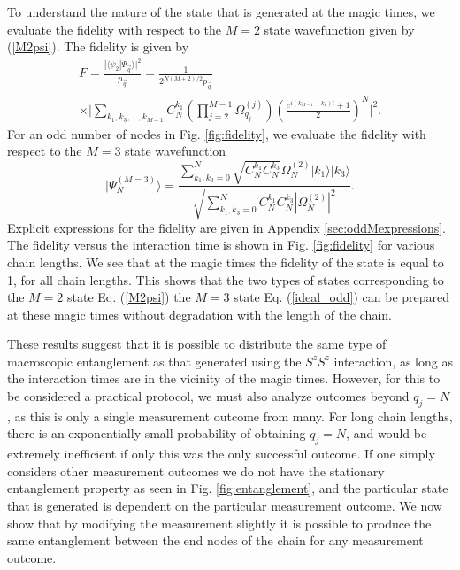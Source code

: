 \documentclass[%
  prx,%
  twocolumn,%
  preprintnumbers,%
  amsmath,%
  amssymb,%
  superscriptaddress%
]{revtex4}
\begin{document}
To understand the nature of the state that is generated at the magic times,  we evaluate the fidelity with respect to the $ M = 2$ state wavefunction given by (\ref{M2psi}). The fidelity is given by
%
\begin{multline}
F = \frac{| \langle  \psi_2 | \Psi_{\vec{q}} \rangle |^2}{p_{\vec{q}}}  = \frac{1}{2^{N(M+2)/2} p_{\vec{q}} } \\
\times \Big| \sum_{k_1, k_3, \dots, k_{M-1} }C_N^{k_1}
\left( \prod_{j=2}^{M-1} \Omega_{q_j}^{(j)} \right) \left(\frac{e^{i(k_{M-1} - k_1)t }+1}{2}\right)^N \Big|^2 .
\label{fideven}
\end{multline}
%
For an odd number of nodes in Fig. \ref{fig:fidelity}, we evaluate the fidelity with respect to the $ M = 3$ state wavefunction
%
\begin{equation}
    \label{ideal_odd}
| \Psi_N^{(M=3)}  \rangle=\frac{\sum_{k_1,k_3=0}^{N} \sqrt{ C^{k_1}_{N}  C^{k_3}_{N} }
 \Omega_{N}^{(2)}  |k_1\rangle|k_3\rangle }{\sqrt{\sum_{k_1,k_3=0}^{N}  C^{k_1}_{N}  C^{k_3}_{N} | \Omega_{N}^{(2)} |^2 } } .
\end{equation}
%
Explicit expressions for the fidelity are given in Appendix \ref{sec:oddMexpressions}.  The fidelity versus the interaction time is shown in Fig. \ref{fig:fidelity} for various chain lengths. We see that at the magic times the fidelity of the state is equal to 1, for all chain lengths.  This shows that the two types of states corresponding to the $ M = 2 $ state Eq. (\ref{M2psi}) the $ M = 3 $ state Eq. (\ref{ideal_odd}) can be prepared at these magic times without degradation with the length of the chain.

These results suggest that it is possible to distribute the same type of macroscopic entanglement as that generated using the $ S^z S^z $ interaction, as long as the interaction times are in the vicinity of the magic times.  However, for this to be considered a practical protocol, we must also analyze outcomes beyond $ q_j = N $, as this is only a single measurement outcome from many.
For long chain lengths, there is an exponentially small probability of obtaining $ q_j = N $, and  would be extremely inefficient if only this was the only successful outcome.  If one simply considers other measurement outcomes we do not have the stationary entanglement property as seen in Fig. \ref{fig:entanglement}, and the particular state that is generated is dependent on the particular measurement outcome.  We now show that by modifying the measurement slightly it is possible to produce the same entanglement between the end nodes of the chain for any measurement outcome.
\end{document}
